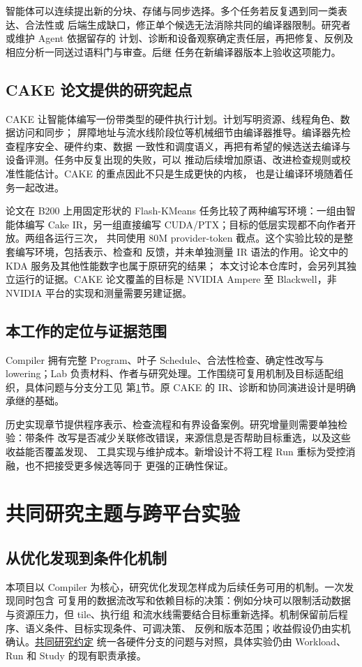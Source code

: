 \documentclass[UTF8,11pt,a4paper,fontset=none]{ctexart}
\newcommand{\researchrepo}[2]{\href{https://github.com/qhy991/open-cake-ir/blob/761f6aa1f798afe8ab6d2ace7bf44cbc120918a0/#1}{#2}}
\begin{document}
智能体可以连续提出新的分块、存储与同步选择。多个任务若反复遇到同一类表达、合法性或
后端生成缺口，修正单个候选无法消除共同的编译器限制。研究者或维护 Agent 依据留存的
计划、诊断和设备观察确定责任层，再把修复、反例及相应分析一同送过语料门与审查。后继
任务在新编译器版本上验收这项能力。

\subsection{CAKE 论文提供的研究起点}
CAKE 让智能体编写一份带类型的硬件执行计划。计划写明资源、线程角色、数据访问和同步；
屏障地址与流水线阶段位等机械细节由编译器推导。编译器先检查程序安全、硬件约束、数据
一致性和调度语义，再把有希望的候选送去编译与设备评测。任务中反复出现的失败，可以
推动后续增加原语、改进检查规则或校准性能估计。CAKE 的重点因此不只是生成更快的内核，
也是让编译环境随着任务一起改进\cite{cake}。

论文在 B200 上用固定形状的 Flash-KMeans 任务比较了两种编写环境：一组由智能体编写
Cake IR，另一组直接编写 CUDA/PTX；目标的低层实现都不向作者开放。两组各运行三次，
共同使用 80M provider-token 截点。这个实验比较的是整套编写环境，包括表示、检查和
反馈，并未单独测量 IR 语法的作用。论文中的 KDA 服务及其他性能数字也属于原研究的结果；
本文讨论本仓库时，会另列其独立运行的证据。CAKE 论文覆盖的目标是 NVIDIA Ampere 至
Blackwell，非 NVIDIA 平台的实现和测量需要另建证据\cite{cake,papercontract}。

\subsection{本工作的定位与证据范围}
Compiler 拥有完整 Program、叶子 Schedule、合法性检查、确定性改写与 lowering；Lab
负责材料、作者与研究处理。工作围绕可复用机制及目标适配组织，具体问题与分支分工见
第\ref{sec:shared-theme}节。原 CAKE 的 IR、诊断和协同演进设计是明确承继的基础。

历史实现章节提供程序表示、检查流程和有界设备案例。研究增量则需要单独检验：带条件
改写是否减少关联修改错误，来源信息是否帮助目标重选，以及这些收益能否覆盖发现、
工具实现与维护成本。新增设计不将工程 Run 重标为受控消融，也不把接受更多候选等同于
更强的正确性保证。

\section{共同研究主题与跨平台实验}\label{sec:shared-theme}

\subsection{从优化发现到条件化机制}
本项目以 Compiler 为核心，研究优化发现怎样成为后续任务可用的机制。一次发现同时包含
可复用的数据流改写和依赖目标的决策：例如分块可以限制活动数据与资源压力，但 tile、执行组
和流水线需要结合目标重新选择。机制保留前后程序、语义条件、目标实现条件、可调决策、
反例和版本范围；收益假设仍由实机确认。\researchrepo{docs/RESEARCH_AGENDA.md}{共同研究约定}
统一各硬件分支的问题与对照，具体实验仍由 Workload、Run 和 Study 的现有职责承接。
\end{document}
